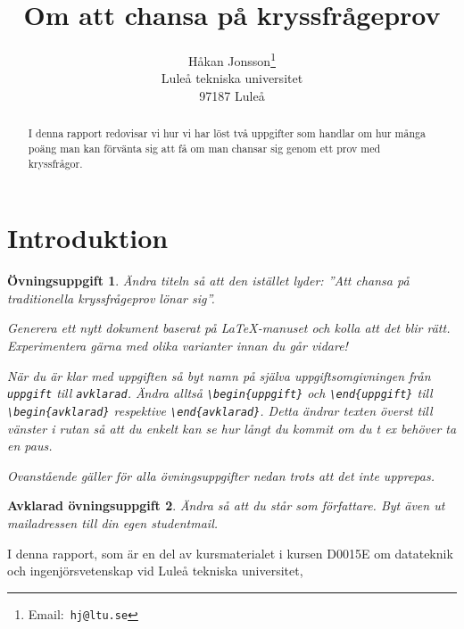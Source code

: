 \documentclass[12pt,a4wide]{article}
\title{Om att chansa på kryssfrågeprov}  %
\author{Håkan Jonsson\thanks{Email:~\texttt{hj@ltu.se}} \\
  Luleå tekniska universitet \\  %
  97187 Luleå}
\theoremstyle{uppgiftsstil}
\newcommand{\ovningstext}{Övningsuppgift}
\newtheorem{ovning}{\ovningstext}
\newenvironment{uppgift}{\begin{framed}\begin{ovning}}%
                        {\end{ovning}\end{framed}}
\theoremstyle{avklaradstil}
\newcommand{\avklaradtext}{Avklarad övningsuppgift}
\newtheorem{klar}[ovning]{\avklaradtext}
\newenvironment{avklarad}{\begin{framed}\begin{klar}}%
                         {\end{klar}\end{framed}}
\begin{document}

\maketitle               %

\begin{abstract}         %
  I denna rapport redovisar vi hur vi har löst två uppgifter
  som handlar om hur många poäng man kan förvänta sig att få om man
  chansar sig genom ett prov med kryssfrågor.
\end{abstract}

\section{Introduktion} %
\begin{uppgift}
  Ändra titeln så att den istället lyder: ''Att chansa på
  traditionella kryssfrågeprov lönar sig''. 

  \medskip

  Generera ett nytt dokument baserat på \LaTeX-manuset och
  kolla att det blir rätt. Experimentera gärna med
  olika varianter innan du går vidare! 

  \medskip

  När du är klar med uppgiften så byt namn på själva
  uppgiftsomgivningen från \texttt{uppgift} till
  \texttt{avklarad}. Ändra alltså \verb|\begin{uppgift}| och
  \verb|\end{uppgift}| till \verb|\begin{avklarad}| respektive
  \verb|\end{avklarad}|. Detta ändrar texten överst till vänster i
  rutan så att du enkelt kan se hur långt du kommit om du t ex behöver
  ta en paus.   

  \medskip

  Ovanstående gäller för alla övningsuppgifter nedan trots att det
  inte upprepas. 
\end{uppgift}
\begin{avklarad}
  Ändra så att du står som författare. Byt även ut mailadressen
  till din egen studentmail. 
\end{avklarad}
I denna rapport, 
som 
är 
en 
del 
av 
kursmaterialet  %
i kursen 
D0015E \label{d0010e} om %
datateknik och ingenjörsvetenskap 
vid Luleå tekniska universitet,
\end{document}
